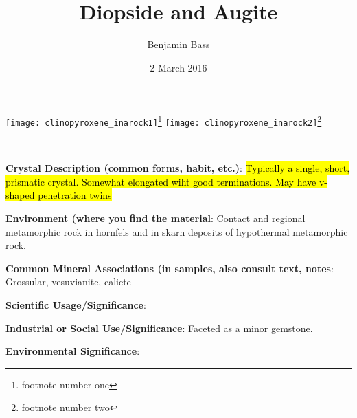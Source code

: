 \documentclass[10pt]{article}
\author{Benjamin Bass}
\date{2 March 2016}
\title{\vspace{-2.0cm}Diopside and Augite} %
\begin{document}
\maketitle


\begin{center}
  \texttt{[image: clinopyroxene\_inarock1]}\footnote{footnote number one}
  \texttt{[image: clinopyroxene\_inarock2]}\footnote{footnote number two}
\end{center}

\
\
\
\
\
\
\
\
\
\

\begin{framed}
  \textbf{Crystal Description (common forms, habit, etc.)}: \hl{Typically a single, short, prismatic crystal. Somewhat elongated wiht good terminations. May have v-shaped penetration twins}
\end{framed}

\begin{framed}
  \textbf{Environment (where you find the material}: Contact and regional metamorphic rock in hornfels and in skarn deposits of hypothermal metamorphic rock.
\end{framed}

\begin{framed}
  \textbf{Common Mineral Associations (in samples, also consult text, notes}: Grossular, vesuvianite, calicte
\end{framed}

\begin{framed}
  \textbf{Scientific Usage/Significance}: 
\end{framed}

\begin{framed}
  \textbf{Industrial or Social Use/Significance}: Faceted as a minor gemstone.
\end{framed}

\begin{framed}
  \textbf{Environmental Significance}: 
\end{framed}

\end{document}

